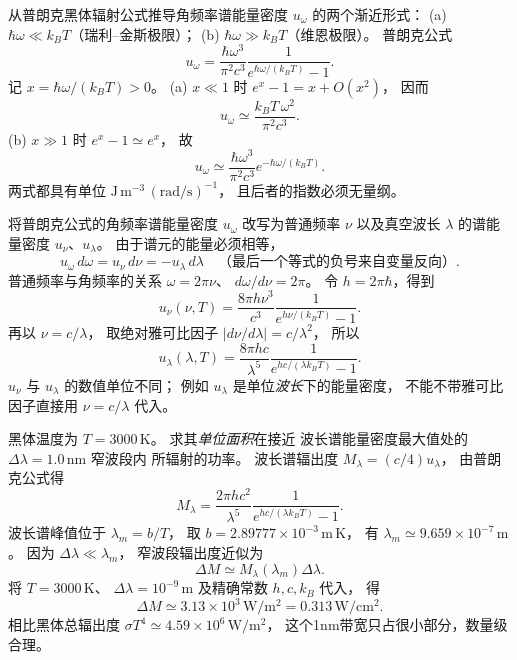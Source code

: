 从普朗克黑体辐射公式推导角频率谱能量密度
$u_\omega$ 的两个渐近形式：
(a) $\hbar\omega\ll k_BT$（瑞利--金斯极限）；
(b) $\hbar\omega\gg k_BT$（维恩极限）。
\exsolution
普朗克公式
\[
 u_\omega=
 \frac{\hbar\omega^3}{\pi^2c^3}
 \frac{1}{e^{\hbar\omega/(k_BT)}-1}.
\]
记 $x=\hbar\omega/(k_BT)>0$。
(a) $x\ll1$ 时
$e^x-1=x+O(x^2)$，
因而
\[
 \boxed{u_\omega\simeq
 \frac{k_BT\,\omega^2}{\pi^2c^3}}.
\]
(b) $x\gg1$ 时
$e^x-1\simeq e^x$，
故
\[
 \boxed{u_\omega\simeq
 \frac{\hbar\omega^3}{\pi^2c^3}
 e^{-\hbar\omega/(k_BT)}}.
\]
\excheck 两式都具有单位
$\mathrm{J\,m^{-3}\,(rad/s)^{-1}}$，
且后者的指数必须无量纲。

将普朗克公式的角频率谱能量密度
$u_\omega$ 改写为普通频率 $\nu$
以及真空波长 $\lambda$ 的谱能量密度
$u_\nu$、$u_\lambda$。
\exsolution
由于谱元的能量必须相等，
\[
 u_\omega\,d\omega=u_\nu\,d\nu
 =-u_\lambda\,d\lambda
\quad\text{（最后一个等式的负号来自变量反向）}.
\]
普通频率与角频率的关系
$\omega=2\pi\nu$、
$d\omega/d\nu=2\pi$。
令 $h=2\pi\hbar$，得到
\[
 \boxed{u_\nu(\nu,T)=
 \frac{8\pi h\nu^3}{c^3}
 \frac{1}{e^{h\nu/(k_BT)}-1}}.
\]
再以 $\nu=c/\lambda$，
取绝对雅可比因子
$|d\nu/d\lambda|=c/\lambda^2$，
所以
\[
 \boxed{u_\lambda(\lambda,T)=
 \frac{8\pi hc}{\lambda^5}
 \frac{1}{e^{hc/(\lambda k_BT)}-1}}.
\]
\excheck $u_\nu$ 与 $u_\lambda$ 的数值单位不同；
例如 $u_\lambda$ 是单位\emph{波长}下的能量密度，
不能不带雅可比因子直接用 $\nu=c/\lambda$ 代入。

黑体温度为 $T=3000\,\mathrm K$。
求其\emph{单位面积}在接近
波长谱能量密度最大值处的
$\Delta\lambda=1.0\,\mathrm{nm}$ 窄波段内
所辐射的功率。
\exsolution
波长谱辐出度
$M_\lambda=(c/4)u_\lambda$，
由普朗克公式得
\[
 M_\lambda=
 \frac{2\pi hc^2}{\lambda^5}
 \frac{1}{e^{hc/(\lambda k_BT)}-1}.
\]
波长谱峰值位于
$\lambda_m=b/T$，
取 $b=2.89777\times10^{-3}\,\mathrm{m\,K}$，
有
$\lambda_m\simeq9.659\times10^{-7}\,\mathrm m$。
因为 $\Delta\lambda\ll\lambda_m$，
窄波段辐出度近似为
\[
 \Delta M\simeq M_\lambda(\lambda_m)\Delta\lambda.
\]
将 $T=3000\,\mathrm K$、
$\Delta\lambda=10^{-9}\,\mathrm m$
及精确常数 $h,c,k_B$ 代入，
得
\[
 \boxed{\Delta M\simeq
 3.13\times10^3\,\mathrm{W/m^2}
 =0.313\,\mathrm{W/cm^2}}.
\]
\excheck 相比黑体总辐出度
$\sigma T^4\simeq4.59\times10^6\,\mathrm{W/m^2}$，
这个1nm带宽只占很小部分，数量级合理。
